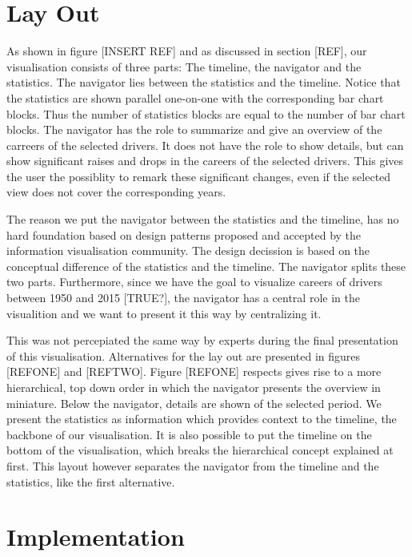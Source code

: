 \documentclass{sigchi}
\begin{document}
\section{Lay Out}
As shown in figure [INSERT REF] and as discussed in section [REF], our visualisation consists of three parts: The timeline, the navigator and the statistics. The navigator lies between the statistics and the timeline. Notice that the statistics are shown parallel one-on-one with the corresponding bar chart blocks. Thus the number of statistics blocks are equal to the number of bar chart blocks. The navigator has the role to summarize and give an overview of the carreers of the selected drivers. It does not have the role to show details, but can show significant raises and drops in the careers of the selected drivers. This gives the user the possiblity to remark these significant changes, even if the selected view does not cover the corresponding years. 

The reason we put the navigator between the statistics and the timeline, has no hard foundation based on design patterns proposed and accepted by the information visualisation community. The design decission is based on the conceptual difference of the statistics and the timeline. The navigator splits these two parts. Furthermore, since we have the goal to visualize careers of drivers between 1950 and 2015 [TRUE?], the navigator has a central role in the visualition and we want to present it this way by centralizing it.

This was not percepiated the same way by experts during the final presentation of this visualisation. Alternatives for the lay out are presented in figures [REFONE] and [REFTWO]. Figure [REFONE] respects gives rise to a more hierarchical, top down order in which the navigator presents the overview in miniature. Below the navigator, details are shown of the selected period. We present the statistics as information which provides context to the timeline, the backbone of our visualisation. It is also possible to put the timeline on the bottom of the visualisation, which breaks the hierarchical concept explained at first. This layout however separates the navigator from the timeline and the statistics, like the first alternative. 





\section{Implementation} %
\label{sec:implementation}
\end{document}
